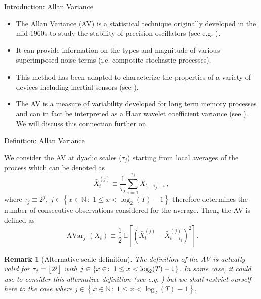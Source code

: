 \documentclass[envcountsect,usenames,dvipsnames]{beamer}
\DeclareMathOperator{\AV}{AVar}
\theoremstyle{mystyle}
\newtheorem{Remark}{Remark}
\DeclarePairedDelimiter\floor{\lfloor}{\rfloor}
\begin{document}
\begin{frame}{Introduction: Allan Variance}
\begin{itemize}
    \item The Allan Variance (AV) is a statistical technique originally developed in the mid-1960s to study the stability of precision oscillators (see e.g. \cite{allan1966statistics}).
    \item It can provide information on the types and magnitude of various superimposed noise terms (i.e. composite stochastic processes). 
    \item This method has been adapted to characterize the properties of a variety of devices including inertial sensors (see \cite{elsheimy08av}).
    \item The AV is a measure of variability developed for long term memory processes and can in fact be interpreted as a Haar wavelet coefficient variance (see \cite{percival1994long}). We will discuss this connection further on.
\end{itemize}
\end{frame}


\begin{frame}{Definition: Allan Variance}

\footnotesize

\begin{Definition}
\label{def:AV}

We consider the AV at dyadic scales ($\tau_j$) starting from local averages of the process which can be denoted as
    \label{def:av}
    \begin{equation*}
    \bar{X}_{t}^{(j)} \equiv \frac{1}{\tau_j} \sum_{i = 1}^{\tau_j} X_{t - \tau_j + i}\, ,
    \label{mean.noav}
\end{equation*}
where $\tau_j \equiv 2^j, \; j  \in \left\{x \in \mathbb{N} \, : \;  1 \leq x < \log_2 (T) - 1 \right\}$ therefore determines the number of consecutive observations considered for the average. Then, the AV is defined as
%
\begin{equation*}
    \AV_j \left(X_t \right) \equiv \frac{1}{2} \, \mathbb{E}\left[ \left(\bar{X}_{t}^{(j)} - \bar{X}_{t-\tau_j}^{(j)} \right)^2 \right].
\end{equation*}
%
\end{Definition}

\begin{Remark}[Alternative scale definition]
The definition of the AV is actually valid for $\tau_j = \floor*{2^j}$ with $j  \in \left\{x \in \real \, : \;  1 \leq x < \log_2 (T) - 1 \right\}$. In some case, it could use to consider this alternative definition (see e.g. \cite{elsheimy08av}) but we shall restrict ourself here to the case where $j  \in \left\{x \in \mathbb{N} \, : \;  1 \leq x < \log_2 (T) - 1 \right\}$.
\end{Remark}

\end{frame}
\end{document}
